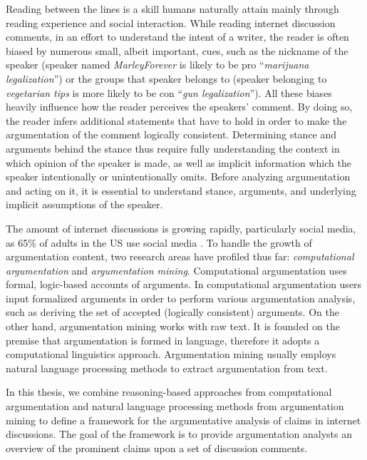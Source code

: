 Reading between the lines is a skill humans naturally attain mainly through
reading experience and social interaction. While reading internet discussion
comments, in an effort to understand the intent of a writer, the reader is
often biased by numerous small, albeit important, cues, such as the nickname
of the speaker (speaker named \emph{MarleyForever} is likely to be pro
``\emph{marijuana legalization}'') or the groups that speaker belongs to
(speaker belonging to \emph{vegetarian tips}
 is more likely to be con ``\emph{gun legalization}'').
All these biases heavily influence how the reader perceives the speakers' comment. 
By doing so, the reader infers additional statements that have to hold
in order to make the argumentation of the comment logically consistent. 
Determining stance and arguments behind the stance thus require 
fully understanding the context in which opinion of the speaker
is made, as well as implicit information which the speaker 
intentionally or unintentionally omits. 
Before analyzing argumentation and acting on it, it is essential to
understand stance, arguments, and underlying implicit assumptions of the speaker. 

The amount of internet discussions is growing rapidly, particularly social
media, as 65\% of adults in the US use social media \citep{perrin2015social}. 
To handle the growth of argumentation content, two research areas have profiled
thus far: \textit{computational argumentation} and \emph{argumentation mining}.
Computational argumentation uses formal, logic-based accounts of arguments. In
computational argumentation users input formalized arguments in order to
perform various argumentation analysis, such as deriving the set of accepted
(logically consistent) arguments.
On the other hand, argumentation mining works with raw text.  It is founded on
the premise that argumentation is formed in language, therefore it adopts a
computational linguistics approach. 
Argumentation mining usually employs natural language processing methods to extract
argumentation from text. 

In this thesis, we combine reasoning-based approaches from
computational argumentation and natural language processing methods
from argumentation mining to define a framework for the 
argumentative analysis of claims in internet discussions. 
The goal of the framework is to provide argumentation analysts 
an overview of the prominent claims upon a set of discussion comments. 


